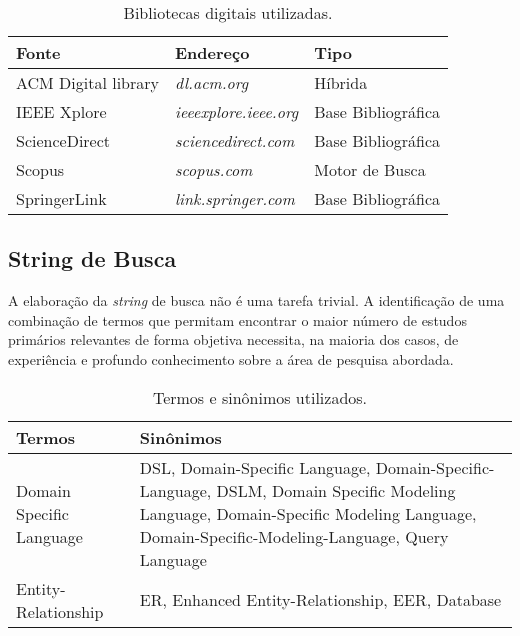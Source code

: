 \begin{table}[!ht]
    \centering
    \footnotesize
    \caption{Bibliotecas digitais utilizadas.}
    \label{tab:BasesDePesquisa}
    \begin{tabular}{m{4cm}m{4cm}m{4cm}}
    \bottomrule
    \rowcolor[HTML]{C0C0C0}
    \textbf{Fonte} & \textbf{Endereço} & \textbf{Tipo} \\ 
    \hline
    ACM Digital library & \textit{dl.acm.org}           & Híbrida\\
    IEEE Xplore         & \textit{ieeexplore.ieee.org}  & Base Bibliográfica \\ 
    ScienceDirect       & \textit{sciencedirect.com}    & Base Bibliográfica \\
    Scopus       & \textit{scopus.com}   & Motor de Busca \\
    SpringerLink        & \textit{link.springer.com}    & Base Bibliográfica \\ 
    \bottomrule
    \end{tabular}
\end{table}
            
    \subsection{String de Busca} \label{ssec:StringBusca}

A elaboração da \textit{string} de busca não é uma tarefa trivial. 
A identificação de uma combinação de termos que permitam encontrar o maior número de estudos primários relevantes de forma objetiva necessita, na maioria dos casos, de experiência e profundo conhecimento sobre a área de pesquisa abordada.  

\begin{table}[!h]
    \centering
    \small
    \caption{Termos e sinônimos utilizados.}
    \label{tab:DefinicaoSearch}
    \begin{tabular}{m{4.5cm}m{10.5cm}}
        \bottomrule
        \rowcolor[HTML]{C0C0C0}
        \textbf{Termos} & \textbf{Sinônimos}\\
        \hline
        Domain Specific Language & DSL, Domain-Specific Language, Domain-Specific-Language, DSLM, Domain Specific Modeling Language, Domain-Specific Modeling Language, Domain-Specific-Modeling-Language, Query Language \\
        \hline
        Entity-Relationship & ER, Enhanced Entity-Relationship, EER, Database \\
        \toprule
    \end{tabular}
\end{table}
        

